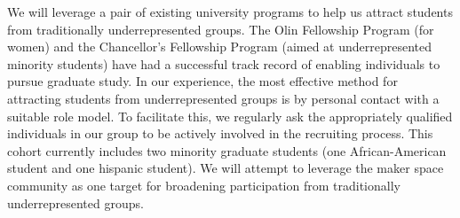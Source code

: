 We will leverage a pair of existing university programs to help us
attract students from traditionally underrepresented groups.  The Olin
Fellowship Program (for women) and the Chancellor's Fellowship Program
(aimed at underrepresented minority students) have had a successful track
record of enabling individuals to pursue graduate study.  In our
experience, the most effective method for attracting students from
underrepresented groups is by personal contact with a suitable role
model.  To facilitate this, we regularly ask the appropriately
qualified individuals in our group to be actively involved in the
recruiting process.  This cohort currently includes two
minority graduate students (one African-American student and one hispanic 
student).
We will attempt to leverage the maker space community as one target
for broadening participation from traditionally underrepresented groups.
